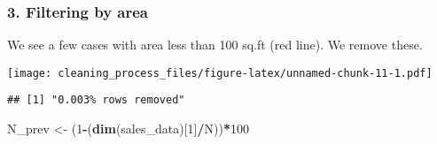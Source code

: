 \documentclass[]{article}
\newenvironment{Shaded}{\begin{snugshade}}{\end{snugshade}}
\newcommand{\DataTypeTok}[1]{\textcolor[rgb]{0.13,0.29,0.53}{#1}}
\newcommand{\DecValTok}[1]{\textcolor[rgb]{0.00,0.00,0.81}{#1}}
\newcommand{\KeywordTok}[1]{\textcolor[rgb]{0.13,0.29,0.53}{\textbf{#1}}}
\newcommand{\NormalTok}[1]{#1}
\newcommand{\OperatorTok}[1]{\textcolor[rgb]{0.81,0.36,0.00}{\textbf{#1}}}
\newcommand{\StringTok}[1]{\textcolor[rgb]{0.31,0.60,0.02}{#1}}
\begin{document}
\hypertarget{filtering-by-area}{%
\subsubsection{3. Filtering by area}\label{filtering-by-area}}

We see a few cases with area less than 100 sq.ft (red line). We remove
these.

\begin{Shaded}
\end{Shaded}

\texttt{[image: cleaning\_process\_files/figure-latex/unnamed-chunk-11-1.pdf]}

\begin{Shaded}
\end{Shaded}

\begin{verbatim}
## [1] "0.003% rows removed"
\end{verbatim}

\begin{Shaded}
\begin{Highlighting}[]
\NormalTok{N_prev <-}\StringTok{ }\NormalTok{(}\DecValTok{1}\OperatorTok{-}\NormalTok{(}\KeywordTok{dim}\NormalTok{(sales_data)[}\DecValTok{1}\NormalTok{]}\OperatorTok{/}\NormalTok{N))}\OperatorTok{*}\DecValTok{100}
\end{Highlighting}
\end{Shaded}
\end{document}
